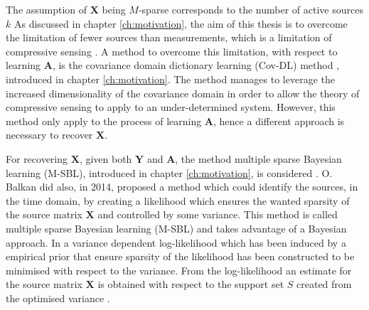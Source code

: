 The assumption of $\textbf{X}$ being $M$-sparse corresponds to the number of active sources $k$ 
As discussed in chapter \ref{ch:motivation}, the aim of this thesis is to overcome the limitation of fewer sources than measurements, which is a limitation of compressive sensing . 
A method to overcome this limitation, with respect to learning $\mathbf{A}$, is the covariance domain dictionary learning (Cov-DL) method \cite{Balkan2015}, introduced in chapter \ref{ch:motivation}. 
The method manages to leverage the increased dimensionality of the covariance domain in order to allow the theory of compressive sensing to apply to an under-determined system. 
However, this method only apply to the process of learning $\mathbf{A}$, hence a different approach is necessary to recover $\mathbf{X}$.

For recovering $\mathbf{X}$, given both $\mathbf{Y}$ and $\mathbf{A}$, the method multiple sparse Bayesian learning (M-SBL), introduced in chapter \ref{ch:motivation}, is considered .
O. Balkan \cite{Balkan2014} did also, in 2014, proposed a method which could identify the sources, in the time domain, by creating a likelihood which ensures the wanted sparsity of the source matrix $\mathbf{X}$ and controlled by some variance. This method is called multiple sparse Bayesian learning (M-SBL) and takes advantage of a Bayesian approach. 
In \cite{Balkan2014} a variance dependent log-likelihood which has been induced by a empirical prior that ensure sparsity of the likelihood has been constructed to be minimised with respect to the variance. 
From the log-likelihood an estimate for the source matrix $\mathbf{X}$ is obtained with respect to the support set $S$ created from the optimised variance .






